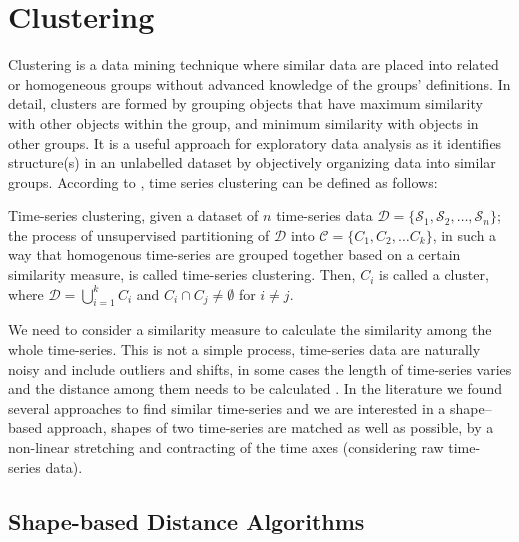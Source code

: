 \section{Clustering}
\label{Sec:TimeSeriesClustering}

Clustering is a data mining technique where similar data are placed into related or homogeneous groups without advanced knowledge of the groups' definitions. In detail, clusters are formed by grouping objects that have maximum similarity with other objects within the group, and minimum similarity with objects in other groups. It is a useful approach for exploratory data analysis as it identifies structure(s) in an unlabelled dataset by objectively organizing data into similar groups. According to \cite{Aghabozorgi2015}, time series clustering can be defined as follows:

\begin{definition} Time-series clustering, given a dataset of $n$ time-series data $\mathcal{D} = \{ \mathcal{S}_1, \mathcal{S}_2, \ldots, \mathcal{S}_n\}$; the process of unsupervised partitioning of $\mathcal{D}$ into $\mathcal{C} = \{C_1, C_2, \ldots C_k\}$, in such a way
that homogenous time-series are grouped together based on a certain similarity measure, is called time-series clustering. Then, $C_i$ is called a cluster, where $\mathcal{D} = \bigcup_{i=1}^{k} C_{i}$ and $C_i \cap C_j \neq \emptyset$ for $i \neq j$.
\end{definition}

We need to consider a similarity measure to calculate the similarity among the whole time-series. This is not a simple process, time-series data are naturally noisy and include outliers and shifts, in some cases the length of time-series varies and the distance among them needs to be calculated \cite{Pal2017}. In the literature we found several approaches to find similar time-series and we are interested in a shape--based approach, shapes of two time-series are matched as well as possible, by a non-linear stretching and contracting of the time axes (considering raw time-series data).

\subsection{Shape-based Distance Algorithms}
\label{sec:ShapeBasedDistance}


